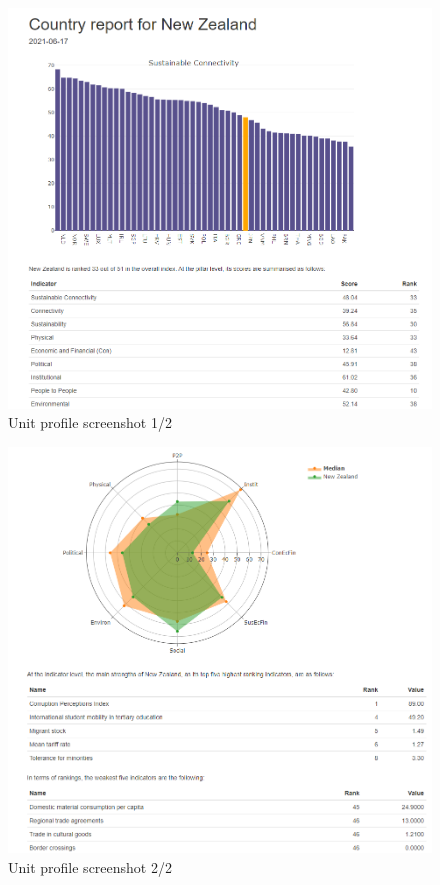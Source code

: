 \documentclass[
]{book}
\begin{document}
\begin{figure}

{\centering \includegraphics[width=1\linewidth]{images/getUnitProfile_screenshot1} 

}

\caption{Unit profile screenshot 1/2}\label{fig:unnamed-chunk-78}
\end{figure}
\begin{figure}

{\centering \includegraphics[width=1\linewidth]{images/getUnitProfile_screenshot2} 

}

\caption{Unit profile screenshot 2/2}\label{fig:unnamed-chunk-79}
\end{figure}
\end{document}
